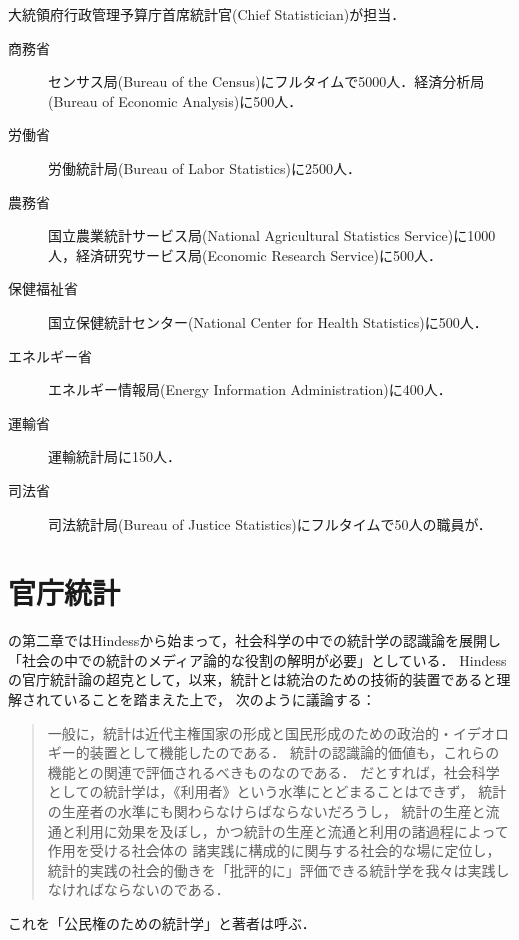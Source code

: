 \documentclass[uplatex,dvipdfmx]{jsreport}
\begin{document}
大統領府行政管理予算庁首席統計官(Chief Statistician)が担当．

\begin{description}
    \item[商務省] センサス局(Bureau of the Census)にフルタイムで5000人．経済分析局(Bureau of Economic Analysis)に500人．
    \item[労働省] 労働統計局(Bureau of Labor Statistics)に2500人．
    \item[農務省] 国立農業統計サービス局(National Agricultural Statistics Service)に1000人，経済研究サービス局(Economic Research Service)に500人．
    \item[保健福祉省] 国立保健統計センター(National Center for Health Statistics)に500人．
    \item[エネルギー省] エネルギー情報局(Energy Information Administration)に400人．
    \item[運輸省] 運輸統計局に150人．
    \item[司法省] 司法統計局(Bureau of Justice Statistics)にフルタイムで50人の職員が．
\end{description}

\section{官庁統計}

\begin{tcolorbox}[colframe=ForestGreen, colback=ForestGreen!10!white,breakable,colbacktitle=ForestGreen!40!white,coltitle=black,fonttitle=\bfseries\sffamily,
title=]
    
\end{tcolorbox}

\begin{remarks}
    \cite{統計と社会経済分析2-思想と方法}の第二章ではHindessから始まって，社会科学の中での統計学の認識論を展開し「社会の中での統計のメディア論的な役割の解明が必要」としている．
    Hindessの官庁統計論の超克として，\cite{Desrosières93}以来，統計とは統治のための技術的装置であると理解されていることを踏まえた上で，
    次のように議論する：
    \begin{quote}
        一般に，統計は近代主権国家の形成と国民形成のための政治的・イデオロギー的装置として機能したのである．
        統計の認識論的価値も，これらの機能との関連で評価されるべきものなのである．
        だとすれば，社会科学としての統計学は，《利用者》という水準にとどまることはできず，
        統計の生産者の水準にも関わらなけらばならないだろうし，
        統計の生産と流通と利用に効果を及ぼし，かつ統計の生産と流通と利用の諸過程によって作用を受ける社会体の
        諸実践に構成的に関与する社会的な場に定位し，
        統計的実践の社会的働きを「批評的に」評価できる統計学を我々は実践しなければならないのである．
    \end{quote}
    これを「公民権のための統計学」と著者は呼ぶ．
\end{remarks}
\end{document}

